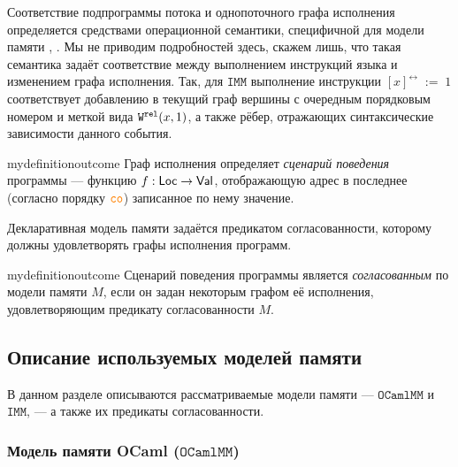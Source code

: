 \documentclass[14pt]{matmex-diploma-custom}
\newcommand{\IMM}{\mathtt{IMM}}
\newcommand{\OMM}{\mathtt{OCaml}\allowbreak \mathtt{MM}}
\begin{document}
Соответствие подпрограммы потока и однопоточного графа исполнения определяется средствами операционной семантики, специфичной для модели памяти \cite{omm}, \cite{imm}. Мы не приводим подробностей здесь, скажем лишь, что такая семантика задаёт соответствие между выполнением инструкций языка и изменением графа исполнения. Так, для $\IMM$ выполнение инструкции $[x]^{\rel}\;:=\;1$ соответствует добавлению в текущий граф вершины с очередным порядковым номером и меткой вида ${\mathtt{W}}^{\mathtt{rel}}(x, 1)$, а также рёбер, отражающих синтаксические зависимости данного события.

\begin{restatable}{mydefinition}{outcome}
  \label{definition:outcome-def}
  Граф исполнения определяет \emph{сценарий поведения} программы --- функцию ${f: \mathsf{Loc} \to \mathsf{Val}}$, отображающую адрес в последнее (согласно порядку $\lCO$) записанное по нему значение. 
\end{restatable}

Декларативная модель памяти задаётся предикатом согласованности, которому должны удовлетворять графы исполнения программ.
\begin{restatable}{mydefinition}{outcome}
  Сценарий поведения программы является \emph{согласованным} по модели памяти $M$, если он задан некоторым графом её исполнения, удовлетворяющим предикату согласованности $M$.
\end{restatable}  


\subsection{Описание используемых моделей памяти}
\label{mm-description}

В данном разделе описываются рассматриваемые модели памяти ---  $\OMM$ и $\IMM$, --- а также их предикаты
согласованности.

\subsubsection{Модель памяти OCaml ($\OMM$)}
\label{ocaml-mm}

\end{document}
